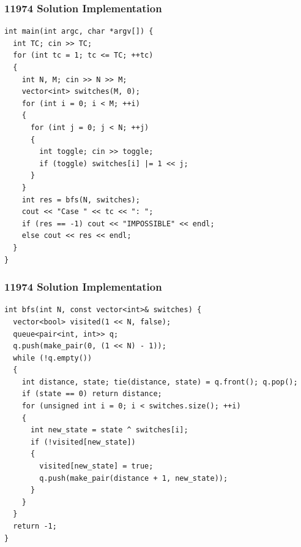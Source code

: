 \documentclass{beamer}
\begin{document}
\begin{frame}[containsverbatim]
\frametitle{11974 Solution Implementation}
\scriptsize
\begin{lstlisting}
int main(int argc, char *argv[]) {
  int TC; cin >> TC;
  for (int tc = 1; tc <= TC; ++tc)
  {
    int N, M; cin >> N >> M;
    vector<int> switches(M, 0);
    for (int i = 0; i < M; ++i)
    {
      for (int j = 0; j < N; ++j)
      {
        int toggle; cin >> toggle;
        if (toggle) switches[i] |= 1 << j;
      }
    }
    int res = bfs(N, switches);
    cout << "Case " << tc << ": ";
    if (res == -1) cout << "IMPOSSIBLE" << endl;
    else cout << res << endl;
  }
}
\end{lstlisting}

\end{frame}

\begin{frame}[containsverbatim]
\frametitle{11974 Solution Implementation}
\scriptsize
\begin{lstlisting}
int bfs(int N, const vector<int>& switches) {
  vector<bool> visited(1 << N, false);
  queue<pair<int, int>> q;
  q.push(make_pair(0, (1 << N) - 1));
  while (!q.empty())
  {
    int distance, state; tie(distance, state) = q.front(); q.pop();
    if (state == 0) return distance;
    for (unsigned int i = 0; i < switches.size(); ++i)
    {
      int new_state = state ^ switches[i];
      if (!visited[new_state])
      {
        visited[new_state] = true;
        q.push(make_pair(distance + 1, new_state));
      }
    }
  }
  return -1;
}
\end{lstlisting}

\end{frame}
\end{document}
